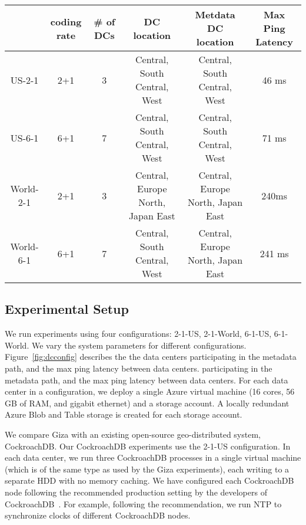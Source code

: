 \begin{figure*}
\begin{tabular}{c|c|c|c|c|c}
& coding rate & \# of DCs & DC location & Metdata DC location & Max Ping Latency\\
\hline
US-2-1 & 2+1 & 3 & Central, South Central, West & Central, South Central, West & 46 ms \\
US-6-1 & 6+1 & 7 & Central, South Central, West & Central, South Central, West & 71 ms\\ 
World-2-1 & 2+1 & 3 & Central, Europe North, Japan East & Central, Europe North, Japan East & 240ms\\
World-6-1 & 6+1 & 7 & Central, South Central, West & Central, Europe North, Japan East & 241 ms\\
\end{tabular}
\caption{The DC configurations and inter-DC latencies in various experiments~\label{fig:dcconfig}} 
\end{figure*}

\subsection{Experimental Setup}
We run experiments using four configurations: 2-1-US, 2-1-World, 6-1-US, 6-1-World.  We vary the system parameters for different configurations. Figure~\ref{fig:dcconfig} describes the the data centers participating in the metadata path, and the max ping latency between data centers. 
 participating in the metadata path, and the max ping latency between data centers. For each data center in a configuration, we deploy a single Azure virtual machine (16 cores, 56 GB of RAM, and gigabit ethernet) and a storage account. A locally redundant Azure Blob and Table storage is created for each storage account.

 We compare Giza with an existing open-source geo-distributed system, CockroachDB.  Our CockroachDB experiments use the 2-1-US configuration. In each data center, we run three CockroachDB processes in a single virtual machine (which is of the same type as used by the Giza experiments), each writing to a separate HDD with no memory caching. We have configured each CockroachDB node following the recommended production setting by the developers of CockroachDB~\cite{XXX}. For example, following the recommendation, we run NTP to synchronize clocks of different CockroachDB nodes.

